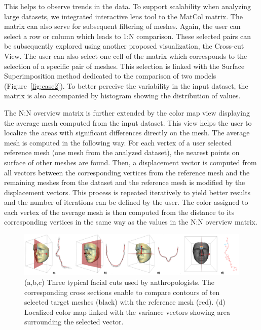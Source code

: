 \documentclass[final,5p,times]{elsarticle}
\begin{document}
This helps to observe trends in the data.
To support scalability when analyzing large datasets, we integrated interactive lens tool to the MatCol matrix.
The matrix can also serve for subsequent filtering of meshes.
Again, the user can select a row or column which leads to 1:N comparison.
These selected pairs can be subsequently explored using another proposed visualization, the Cross-cut View.
The user can also select one cell of the matrix which corresponds to the selection of a specific pair of meshes.
This selection is linked with the Surface Superimposition method dedicated to the comparison of two models (Figure~\ref{fig:case2}).
To better perceive the variability in the input dataset, the matrix is also accompanied by histogram showing the distribution of values.

The N:N overview matrix is further extended by the color map view displaying the average mesh computed from the input dataset. 
This view helps the user to localize the areas with significant differences directly on the mesh.
The average mesh is computed in the following way.
For each vertex of a user selected reference mesh (one mesh from the analyzed dataset), the nearest points on surface of other meshes are found.
Then, a displacement vector is computed from all vectors between the corresponding vertices from the reference mesh and the remaining meshes from the dataset and the reference mesh is modified by the displacement vectors.
This process is repeated iteratively to yield better results and the number of iterations can be defined by the user.
The color assigned to each vertex of the average mesh is then computed from the distance to its corresponding vertices in the same way as the values in the N:N overview matrix.

\begin{figure}[htb]
	\centering
  \includegraphics[width=0.9\linewidth]{pictures/cross.png}
  \caption{\label{fig:cross} (a,b,c) Three typical facial cuts used by anthropologists. The corresponding cross sections enable to compare contours of ten selected target meshes (black) with the reference mesh (red). (d) Localized color map linked with the variance vectors showing area surrounding the selected vector.}
	\vspace{-3mm}
\end{figure}
\end{document}
